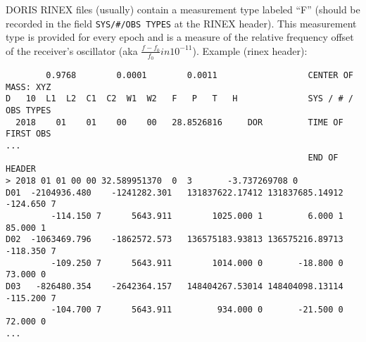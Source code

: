 DORIS RINEX files (usually) contain a measurement type labeled ``F'' (should be 
recorded in the field \verb|SYS/#/OBS TYPES| at the RINEX header). This measurement 
type is provided for every epoch and is a measure of the relative frequency 
offset of the receiver's oscillator (aka \(\frac{f-f_0}{f_0} in 10^{-11}\)).
Example (rinex header):
\begin{verbatim}
        0.9768        0.0001        0.0011                  CENTER OF MASS: XYZ
D   10  L1  L2  C1  C2  W1  W2   F   P   T   H              SYS / # / OBS TYPES
  2018    01    01    00    00   28.8526816     DOR         TIME OF FIRST OBS
...
                                                            END OF HEADER
> 2018 01 01 00 00 32.589951370  0  3       -3.737269708 0
D01  -2104936.480    -1241282.301   131837622.17412 131837685.14912      -124.650 7
         -114.150 7      5643.911        1025.000 1         6.000 1        85.000 1
D02  -1063469.796    -1862572.573   136575183.93813 136575216.89713      -118.350 7
         -109.250 7      5643.911        1014.000 0       -18.800 0        73.000 0
D03   -826480.354    -2642364.157   148404267.53014 148404098.13114      -115.200 7
         -104.700 7      5643.911         934.000 0       -21.500 0        72.000 0
...                                                            
\end{verbatim}